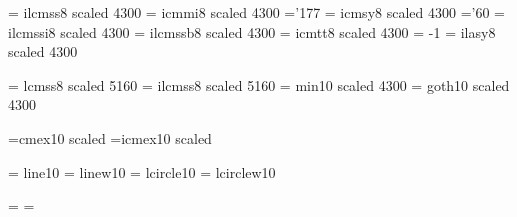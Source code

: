 \font\ithirtyfourrm   = ilcmss8  scaled 4300 %
\font\ithirtyfouri    = icmmi8   scaled 4300 %
    \skewchar\ithirtyfouri ='177                  %
\font\ithirtyfoursy   = icmsy8   scaled 4300 %
    \skewchar\ithirtyfoursy ='60           %
\font\ithirtyfourit   = ilcmssi8 scaled 4300 %
\font\ithirtyfourbf   = ilcmssb8 scaled 4300 %
\font\ithirtyfourtt   = icmtt8   scaled 4300 %
    \hyphenchar\ithirtyfourtt = -1         %
\font\ithirtyfourlasy = ilasy8  scaled 4300 %

\font\fortyonerm  = lcmss8  scaled 5160 %
\font\ifortyonerm = ilcmss8 scaled 5160 %
\font\fortyonemin = min10 scaled 4300
\font\fortyonegt = goth10 scaled 4300

\font\tenex =cmex10  scaled
\font\itenex=icmex10 scaled

\font\tenln    = line10
\font\tenlnw   = linew10
\font\tencirc  = lcircle10
\font\tencircw = lcirclew10

\ifnum{}\tenln=\tencirc \else 
  \fi
\ifnum{}\tenlnw=\tencircw \else 
  \fi


\lineskip 1pt
\normallineskip 1pt

\def\@subfam#1#2{\@warning{No \string#1\space typeface in 
        SLiTeX, using \string#2}#2}


\def\rm{\protect\prm}
\def\it{\protect\pit}
\def\bf{\protect\pbf}
\def\tt{\protect\ptt}
\def\sl{\@subfam\sl\it}
\def\sf{\@subfam\sf\rm}
\def\sc{\@subfam\sc\rm}
\def\min{\protect\pmin}
\def\gt{\protect\pgt}

\def\em{\protect\pem{}}
\def\pem{\ifdim \fontdimen\@ne\font >\z@ \rm \else \it \fi}

\def\mit{\fam\@ne} 
\def\cal{\fam\tw@}

\def\boldmath{\@warning{No \string\boldmath\space in SLiTeX}}
\let\unboldmath=\relax

\def\@nomath#1{\ifmmode \@warning{\string#1\space in math mode.}\fi}


%
\newfam\itfam      %
\newfam\slfam      %
\newfam\bffam      %
\newfam\ttfam      %
\newfam\sffam      %
\newfam\scfam      %
\newfam\lyfam      %
\newfam\minfam     %
\newfam\gtfam      %


